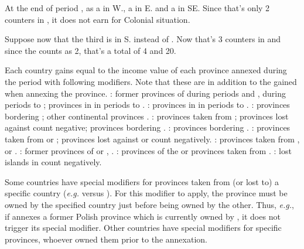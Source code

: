 \begin{exemple}
  At the end of period , \POR as a \COL\faceplus in
  \granderegionRecife W., a \COL \facemoins in \granderegionBelem E. and a
  \COL \facemoins in \granderegionAmazonia SE. Since that's only 2 \COL
  counters in \continentBrazil, it does not earn \VPs for Colonial situation.

  Suppose now that the third \COL is in \granderegionRio S. instead of
  \granderegionAmazonia. Now that's 3 counters in \continentBrazil and since
  the \COL\faceplus counts as 2, that's a total of 4 \COL and 20\VPs.
\end{exemple}

 Each country gains \VPs equal to the income value
of each province annexed during the period with following modifiers. Note that
these are in addition to the \VPs gained when annexing the province.
\bparag \FRA: former provinces of \paysBourgogne {} during
periods  and ,  during periods
 to ; provinces in \regionItalie {}
in periods  to .
\bparag \SPA: provinces in \regionItalie {} in periods
 to .
\bparag \ENG: provinces bordering \regionMediterranee {};
other continental provinces .
\bparag \TUR: provinces taken from \paysPerse {}; provinces
lost against \paysPerse count negative; provinces bordering
\regionMediterranee {}.
\bparag \SUE: provinces bordering \regionBaltique {}.
\bparag \RUS: provinces taken from \POL or \paysPologne {} ;
provinces lost against \POL or \paysPologne count negatively.
\bparag \POL: provinces taken from \RUS, \SUE or
\paysSuede{}.
\bparag \AUS: former provinces of \paysHongrie or \paysMoldavie,
\provinceSerbia {}.
\bparag \PRU: provinces of the \HRE or provinces taken from \paysPologne
{}.
\bparag \VEN: lost islands in \regionMediterranee count negatively.

\aparag Some countries have special modifiers for provinces taken from
(or lost to) a specific country (\emph{e.g.} \RUS versus \POL). For this
modifier to apply, the province must be owned by the specified country
just before being owned by the other.
\bparag Thus, \emph{e.g.}, if \RUS annexes a former Polish province
which is currently owned by \SUE, it does not trigger its special
modifier.
\bparag Other countries have special modifiers for specific provinces,
whoever owned them prior to the annexation.


